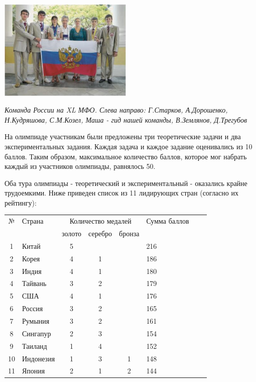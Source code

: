 \begin{multicols*}{2}
    
    \columnbreak

    \begin{center}
        \includegraphics[width=0.48\textwidth]{team.png}
    \end{center}
    \textit{Команда России на XL МФО. Слева направо: Г.Старков, А.Дорошенко, Н.Кудряшова, С.М.Козел, Маша - гид нашей команды, В.Землянов, Д.Трегубов}

    \vspace{10pt}

    На олимпиаде участникам были предложены три теоретические задачи и два экспериментальных задания. Каждая задача и каждое задание оценивались из 10 баллов. Таким образом, максимальное количество баллов, которое мог набрать каждый из участников олимпиады, равнялось 50.

    Оба тура олимпиады - теоретический и экспериментальный - оказались крайне трудоемкими. Ниже приведен список из 11 лидирующих стран (согласно их рейтингу):
    \begin{center}
        \begin{tabular}{clcccp{1.5cm}cc}
            № & Страна & \multicolumn{3}{c}{Количество медалей} & Сумма баллов \\
             & & золото & серебро & бронза & \\
             1 & Китай & 5 & & & 216 \\
             2 & Корея & 4 & 1 & & 186 \\
             3 & Индия & 4 & 1 & & 180 \\
             4 & Тайвань & 3 & 2 & & 179 \\
             5 & США & 4 & 1 & & 176 \\
             6 & Россия & 3 & 2 & & 165 \\
             7 & Румыния & 3 & 2 & & 161 \\
             8 & Сингапур & 2 & 3 & & 154 \\
             9 & Таиланд & 1 & 4 & & 152 \\
             10 & Индонезия & 1 & 3 & 1 & 148 \\
             11 & Япония & 2 & 1 & 2 & 144 \\
        \end{tabular}
    \end{center}


\end{multicols*}
